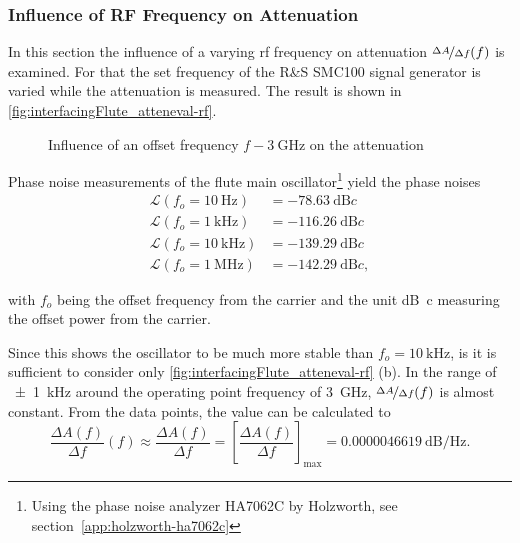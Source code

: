 \newpage
\subsubsection{Influence of RF Frequency on Attenuation}
In this section the influence of a varying \gls{rf} frequency on attenuation $\nicefrac{\Delta A}{\Delta f} (f)$ is examined. For that the set frequency of the R\&S SMC100 signal generator is varied while the attenuation is measured. The result is shown in \autoref{fig:interfacingFlute_atteneval-rf}.

\begin{figure}[H]
    \centering
        \subfloat[$f=f_o \SI{+-30}{\kHz}$]{}
        \qquad
        \subfloat[$f=f_o \SI{+-1}{\kHz}$]{}
       \caption[Influence of an offset frequency on attenuation]{Influence of an offset frequency $f-\SI{3}{\GHz}$ on the attenuation }
    \label{fig:interfacingFlute_atteneval-rf}
\end{figure}

Phase noise measurements of the \gls{flute} main oscillator\footnote{Using the phase noise analyzer HA7062C by Holzworth, see section~\ref{app:holzworth-ha7062c}} yield the phase noises
\begin{align}
\mathscr{L}(f_o=\SI{10}{\hertz}) &= \SI{-78.63}{\dB c}\\
\mathscr{L}(f_o=\SI{1}{\kilo\hertz}) &= \SI{-116.26}{\dB c}\\
\mathscr{L}(f_o=\SI{10}{\kilo\hertz}) &= \SI{-139.29}{\dB c}\\
\mathscr{L}(f_o=\SI{1}{\mega\hertz}) &= \SI{-142.29}{\dB c},
\end{align}

with $f_o$ being the offset frequency from the carrier and the unit \si{\dB c} measuring the offset power from the carrier.

Since this shows the oscillator to be much more stable than $f_o=\SI{10}{\kHz}$, is it is sufficient to consider only \autoref{fig:interfacingFlute_atteneval-rf} (b). In the range of \SI{\pm1}{\kHz} around the operating point frequency of \SI{3}{\GHz}, $\nicefrac{\Delta A}{\Delta f} (f)$ is almost constant. From the data points, the value can be calculated to
\begin{equation}
\frac{\Delta A(f)}{\Delta f}(f) 
\approx \frac{\Delta A(f)}{\Delta f} 
= \left[\frac{\Delta A(f)}{\Delta f}\right]_\text{max}
=\SI{0.0000046619}{\dB\per\hertz}.
\end{equation}

